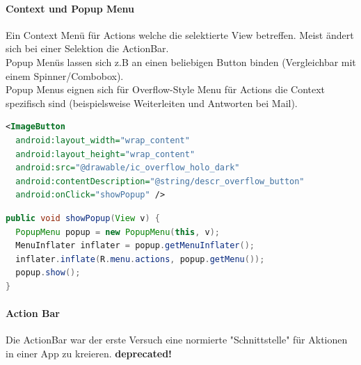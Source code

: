 
\paragraph{Context und Popup Menu} Ein Context Menü für Actions welche die selektierte View betreffen. Meist ändert sich bei einer Selektion die ActionBar.\\
Popup Menüs lassen sich z.B an einen beliebigen Button binden (Vergleichbar mit einem Spinner/Combobox). \\
Popup Menus eignen sich für Overflow-Style Menu für Actions die Context spezifisch sind (beispielsweise Weiterleiten und Antworten bei Mail). 
\begin{lstlisting}[language=xml]
<ImageButton
  android:layout_width="wrap_content" 
  android:layout_height="wrap_content" 
  android:src="@drawable/ic_overflow_holo_dark"
  android:contentDescription="@string/descr_overflow_button"
  android:onClick="showPopup" />
\end{lstlisting}
\begin{lstlisting}[language=java]
public void showPopup(View v) {
  PopupMenu popup = new PopupMenu(this, v);
  MenuInflater inflater = popup.getMenuInflater();
  inflater.inflate(R.menu.actions, popup.getMenu());
  popup.show();
}
\end{lstlisting}
\paragraph{Action Bar} Die ActionBar war der erste Versuch eine normierte "{}Schnittstelle"{} für Aktionen in einer App zu kreieren. \textbf{deprecated!}

